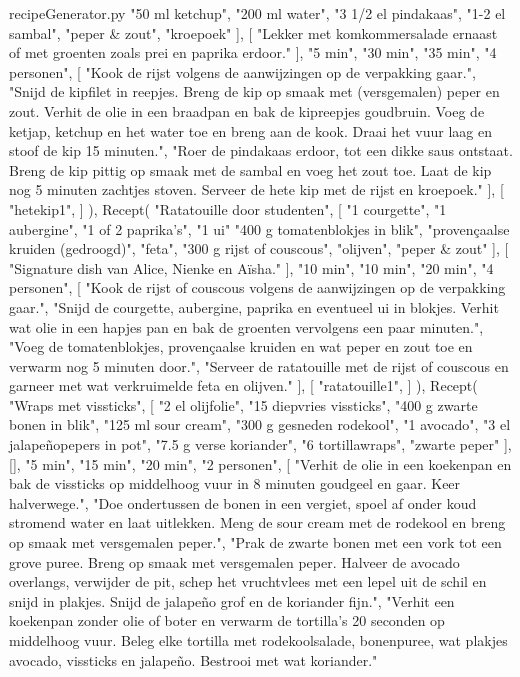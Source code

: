 \begin{filecontents*}{recipeGenerator.py}
		"50 ml ketchup",
		"200 ml water",
		"3 1/2 el pindakaas",
		"1-2 el sambal",
		"peper \& zout",
		"kroepoek"
	],
	[
		"Lekker met komkommersalade ernaast of met groenten zoals prei en paprika erdoor."
	],
	"5 min",
	"30 min",
	"35 min",
	"4 personen",
	[
		"Kook de rijst volgens de aanwijzingen op de verpakking gaar.",
		"Snijd de kipfilet in reepjes. Breng de kip op smaak met (versgemalen) peper en zout. Verhit de olie in een braadpan en bak de kipreepjes goudbruin. Voeg de ketjap, ketchup en het water toe en breng aan de kook. Draai het vuur laag en stoof de kip 15 minuten.",
		"Roer de pindakaas erdoor, tot een dikke saus ontstaat. Breng de kip pittig op smaak met de sambal en voeg het zout toe. Laat de kip nog 5 minuten zachtjes stoven. Serveer de hete kip met de rijst en kroepoek."
	],
	[
	"hetekip1",
	]
),
Recept(
	"Ratatouille door studenten",
	[
		"1 courgette",
		"1 aubergine",
		"1 of 2 paprika's",
		"1 ui"
		"400 g tomatenblokjes in blik",
		"provençaalse kruiden (gedroogd)",
		"feta",
		"300 g rijst of couscous",
		"olijven",
		"peper \& zout"
	],
	[
		"Signature dish van Alice, Nienke en Aïsha."
	],
	"10 min",
	"10 min",
	"20 min",
	"4 personen",
	[
		"Kook de rijst of couscous volgens de aanwijzingen op de verpakking gaar.",
		"Snijd de courgette, aubergine, paprika en eventueel ui in blokjes. Verhit wat olie in een hapjes pan en bak de groenten vervolgens een paar minuten.",
		"Voeg de tomatenblokjes, provençaalse kruiden en wat peper en zout toe en verwarm nog 5 minuten door.",
		"Serveer de ratatouille met de rijst of couscous en garneer met wat verkruimelde feta en olijven."
	],
	[
	"ratatouille1",
	]
),
Recept(
	"Wraps met vissticks",
	[
		"2 el olijfolie",
		"15 diepvries vissticks",
		"400 g zwarte bonen in blik",
		"125 ml sour cream",
		"300 g gesneden rodekool",
		"1 avocado",
		"3 el jalapeñopepers in pot",
		"7.5 g verse koriander",
		"6 tortillawraps",
		"zwarte peper"
	],
	[],
	"5 min",
	"15 min",
	"20 min",
	"2 personen",
	[
		"Verhit de olie in een koekenpan en bak de vissticks op middelhoog vuur in 8 minuten goudgeel en gaar. Keer halverwege.",
		"Doe ondertussen de bonen in een vergiet, spoel af onder koud stromend water en laat uitlekken. Meng de sour cream met de rodekool en breng op smaak met versgemalen peper.",
		"Prak de zwarte bonen met een vork tot een grove puree. Breng op smaak met versgemalen peper. Halveer de avocado overlangs, verwijder de pit, schep het vruchtvlees met een lepel uit de schil en snijd in plakjes. Snijd de jalapeño grof en de koriander fijn.",
		"Verhit een koekenpan zonder olie of boter en verwarm de tortilla’s 20 seconden op middelhoog vuur. Beleg elke tortilla met rodekoolsalade, bonenpuree, wat plakjes avocado, vissticks en jalapeño. Bestrooi met wat koriander."

\end{filecontents*}

